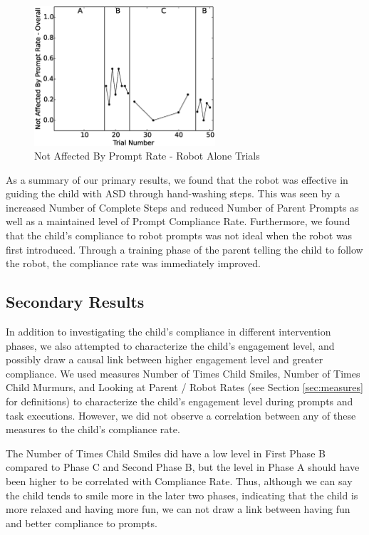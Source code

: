 \begin{figure} [h]
	\centering
	\includegraphics[width=0.6\textwidth]{./img/data_analysis/99NotAffectedByPromptRate-Overall_robotAloneOnly.eps}
	\caption{Not Affected By Prompt Rate - Robot Alone Trials}
	\label{fig:99NotAffectedByPromptRate-Overall_robotAloneOnly}
\end{figure}

As a summary of our primary results, we found that the robot was effective in guiding the child with ASD through hand-washing steps.  This was seen by a increased Number of Complete Steps and reduced Number of Parent Prompts as well as a maintained level of Prompt Compliance Rate.  Furthermore, we found that the child's compliance to robot prompts was not ideal when the robot was first introduced.  Through a training phase of the parent telling the child to follow the robot, the compliance rate was immediately improved.

\subsection{Secondary Results}
In addition to investigating the child's compliance in different intervention phases, we also attempted to characterize the child's engagement level, and possibly draw a causal link between higher engagement level and greater compliance.  We used measures Number of Times Child Smiles, Number of Times Child Murmurs, and Looking at Parent / Robot Rates (see Section \ref{sec:measures} for definitions) to characterize the child's engagement level during prompts and task executions.  However, we did not observe a correlation between any of these measures to the child's compliance rate.

The Number of Times Child Smiles did have a low level in First Phase B compared to Phase C and Second Phase B, but the level in Phase A should have been higher to be correlated with Compliance Rate.  Thus, although we can say the child tends to smile more in the later two phases, indicating that the child is more relaxed and having more fun, we can not draw a link between having fun and better compliance to prompts.


